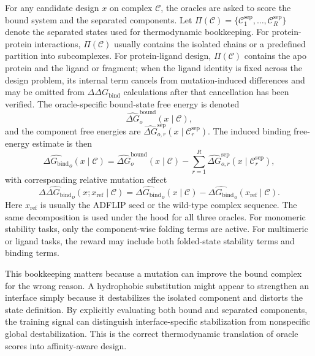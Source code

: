 \documentclass[11pt]{article}
\newcommand{\DGbind}{\ensuremath{\Delta G_{\mathrm{bind}}}}
\newcommand{\DDGbind}{\ensuremath{\Delta\Delta G_{\mathrm{bind}}}}
\begin{document}
For any candidate design $x$ on complex $\mathcal{C}$, the oracles are asked to score the bound system and the separated components. Let $\Pi(\mathcal{C})=\{\mathcal{C}^{\mathrm{sep}}_1,\ldots,\mathcal{C}^{\mathrm{sep}}_R\}$ denote the separated states used for thermodynamic bookkeeping. For protein-protein interactions, $\Pi(\mathcal{C})$ usually contains the isolated chains or a predefined partition into subcomplexes. For protein-ligand design, $\Pi(\mathcal{C})$ contains the apo protein and the ligand or fragment; when the ligand identity is fixed across the design problem, its internal term cancels from mutation-induced differences and may be omitted from $\DDGbind$ calculations after that cancellation has been verified. The oracle-specific bound-state free energy is denoted
\begin{equation}
    \widehat{\Delta G}^{\mathrm{bound}}_o(x\mid\mathcal{C}),
\end{equation}
and the component free energies are $\widehat{\Delta G}^{\mathrm{sep}}_{o,r}(x\mid\mathcal{C}^{\mathrm{sep}}_r)$. The induced binding free-energy estimate is then
\begin{equation}
\label{eq:binddef_v11}
    \widehat{\DGbind}_o(x\mid\mathcal{C}) = \widehat{\Delta G}^{\mathrm{bound}}_o(x\mid\mathcal{C}) - \sum_{r=1}^{R} \widehat{\Delta G}^{\mathrm{sep}}_{o,r}(x\mid\mathcal{C}^{\mathrm{sep}}_r),
\end{equation}
with corresponding relative mutation effect
\begin{equation}
\label{eq:ddgbind_v11}
    \widehat{\DDGbind}_o(x;x_{\mathrm{ref}}\mid\mathcal{C}) = \widehat{\DGbind}_o(x\mid\mathcal{C}) - \widehat{\DGbind}_o(x_{\mathrm{ref}}\mid\mathcal{C}).
\end{equation}
Here $x_{\mathrm{ref}}$ is usually the ADFLIP seed or the wild-type complex sequence. The same decomposition is used under the hood for all three oracles. For monomeric stability tasks, only the component-wise folding terms are active. For multimeric or ligand tasks, the reward may include both folded-state stability terms and binding terms.

This bookkeeping matters because a mutation can improve the bound complex for the wrong reason. A hydrophobic substitution might appear to strengthen an interface simply because it destabilizes the isolated component and distorts the state definition. By explicitly evaluating both bound and separated components, the training signal can distinguish interface-specific stabilization from nonspecific global destabilization. This is the correct thermodynamic translation of oracle scores into affinity-aware design.
\end{document}
